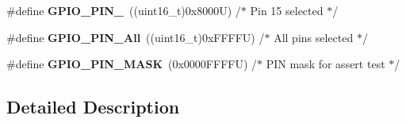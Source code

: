 \begin{DoxyCompactItemize}
\#define {\bfseries G\+P\+I\+O\+\_\+\+P\+I\+N\+\_}~((uint16\+\_\+t)0x8000\+U)  /$\ast$ Pin 15 selected   $\ast$/
\item 
\mbox{\label{group___g_p_i_o__pins_gac04170878de13aa9785f6bd666c9faa5}} 
\#define {\bfseries G\+P\+I\+O\+\_\+\+P\+I\+N\+\_\+\+All}~((uint16\+\_\+t)0x\+F\+F\+F\+F\+U)  /$\ast$ All pins selected $\ast$/
\item 
\mbox{\label{group___g_p_i_o__pins_gab135afee57cdef0f647ab153f88b6d2f}} 
\#define {\bfseries G\+P\+I\+O\+\_\+\+P\+I\+N\+\_\+\+M\+A\+SK}~(0x0000\+F\+F\+F\+F\+U) /$\ast$ P\+I\+N mask for assert test $\ast$/
\end{DoxyCompactItemize}


\subsection{Detailed Description}
